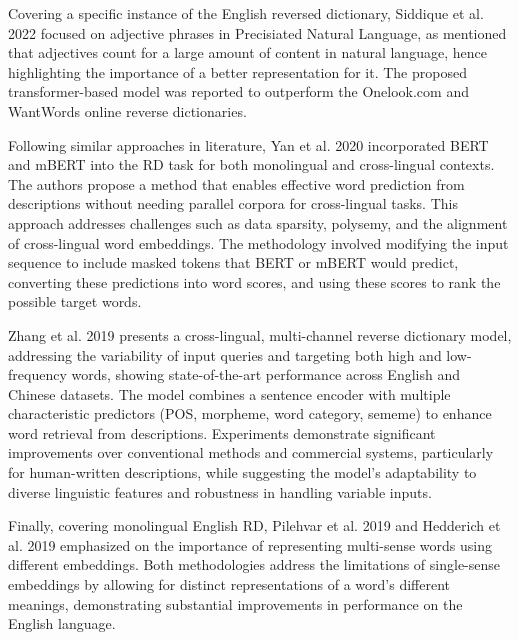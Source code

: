\documentclass[15pt]{article}
\begin{document}
Covering a specific instance of the English reversed dictionary, Siddique et al. 2022 \cite{Siddique2022} focused on adjective phrases in Precisiated Natural Language, as mentioned that adjectives count for a large amount of content in natural language, hence highlighting the importance of a better representation for it. The proposed transformer-based model was reported to outperform the Onelook.com and WantWords online reverse dictionaries.

Following similar approaches in literature, Yan et al. 2020 \cite{Yan2020} incorporated BERT and mBERT into the RD task for both monolingual and cross-lingual contexts. The authors propose a method that enables effective word prediction from descriptions without needing parallel corpora for cross-lingual tasks. This approach addresses challenges such as data sparsity, polysemy, and the alignment of cross-lingual word embeddings. The methodology involved modifying the input sequence to include masked tokens that BERT or mBERT would predict, converting these predictions into word scores, and using these scores to rank the possible target words.

Zhang et al. 2019 \cite{Zhang2019} presents a cross-lingual, multi-channel reverse dictionary model, addressing the variability of input queries and targeting both high and low-frequency words, showing state-of-the-art performance across English and Chinese datasets. The model combines a sentence encoder with multiple characteristic predictors (POS, morpheme, word category, sememe) to enhance word retrieval from descriptions. Experiments demonstrate significant improvements over conventional methods and commercial systems, particularly for human-written descriptions, while suggesting the model's adaptability to diverse linguistic features and robustness in handling variable inputs.

Finally, covering monolingual English RD, Pilehvar et al. 2019 \cite{Pilehvar2019} and Hedderich et al. 2019 \cite{Hedderich2019} emphasized on the importance of representing multi-sense words using different embeddings. Both methodologies address the limitations of single-sense embeddings by allowing for distinct representations of a word's different meanings, demonstrating substantial improvements in performance on the English language.
\end{document}
